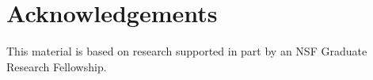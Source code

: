 \section*{Acknowledgements}

This material is based on research supported in part by an NSF Graduate Research Fellowship.
